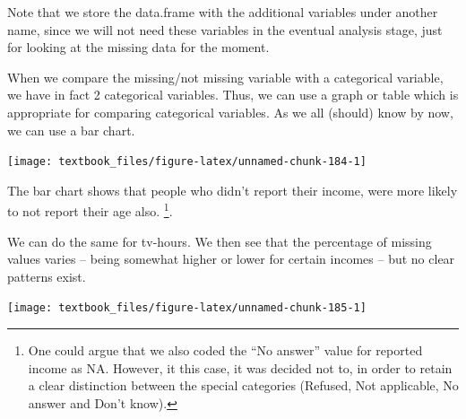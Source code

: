 \documentclass[]{tufte-book}
\newenvironment{Shaded}{}{}
\newcommand{\DataTypeTok}[1]{\textcolor[rgb]{0.56,0.13,0.00}{#1}}
\newcommand{\KeywordTok}[1]{\textcolor[rgb]{0.00,0.44,0.13}{\textbf{#1}}}
\newcommand{\NormalTok}[1]{#1}
\newcommand{\OperatorTok}[1]{\textcolor[rgb]{0.40,0.40,0.40}{#1}}
\newcommand{\StringTok}[1]{\textcolor[rgb]{0.25,0.44,0.63}{#1}}
\begin{document}
Note that we store the data.frame with the additional variables under another name, since we will not need these variables in the eventual analysis stage, just for looking at the missing data for the moment.

When we compare the missing/not missing variable with a categorical variable, we have in fact 2 categorical variables. Thus, we can use a graph or table which is appropriate for comparing categorical variables. As we all (should) know by now, we can use a bar chart.

\begin{Shaded}
\end{Shaded}

\texttt{[image: textbook\_files/figure-latex/unnamed-chunk-184-1]}

The bar chart shows that people who didn't report their income, were more likely to not report their age also. \footnote{One could argue that we also coded the ``No answer'' value for reported income as NA. However, it this case, it was decided not to, in order to retain a clear distinction between the special categories (Refused, Not applicable, No answer and Don't know).}.

We can do the same for tv-hours. We then see that the percentage of missing values varies -- being somewhat higher or lower for certain incomes -- but no clear patterns exist.

\begin{Shaded}
\end{Shaded}

\texttt{[image: textbook\_files/figure-latex/unnamed-chunk-185-1]}
\end{document}
